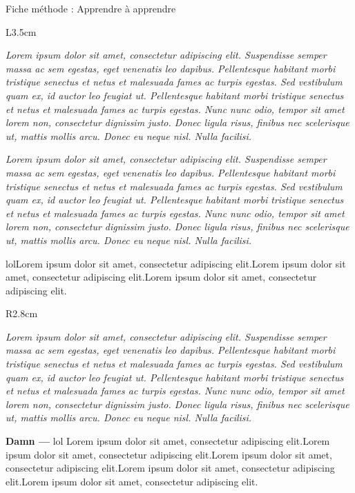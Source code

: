 \documentclass[10pt]{article}
\newcommand{\titre}{Fiche méthode : Apprendre à apprendre} %
\newcommand{\introduction}{
    Lorem ipsum dolor sit amet, consectetur adipiscing elit. Suspendisse semper massa ac sem egestas, eget venenatis leo dapibus. Pellentesque habitant morbi tristique senectus et netus et malesuada fames ac turpis egestas. Sed vestibulum quam ex, id auctor leo feugiat ut. Pellentesque habitant morbi tristique senectus et netus et malesuada fames ac turpis egestas. Nunc nunc odio, tempor sit amet lorem non, consectetur dignissim justo. Donec ligula risus, finibus nec scelerisque ut, mattis mollis arcu. Donec eu neque nisl. Nulla facilisi.
    }
\begin{document}
\thispagestyle{fancy}
\cfoot{}

\begin{titlebox}{\titre}
    \begin{wrapfigure}[]{L}{3.5cm}
        \vspace*{-0.7cm}
    \end{wrapfigure}%
    \textit{\introduction}
    
    \tcblower
    
    \textit{\introduction}
    

    lolLorem ipsum dolor sit amet, consectetur adipiscing elit.Lorem ipsum dolor sit amet, consectetur adipiscing elit.Lorem ipsum dolor sit amet, consectetur adipiscing elit.


        \begin{wrapfigure}[]{R}{2.8cm}
            \vspace*{-0.75cm}
        \vspace{-30pt}
        \end{wrapfigure}%
        \textit{\introduction}
    \linebreak[4]

    
    \textbf{\color{DarkRed} Damn ---} lol Lorem ipsum dolor sit amet, consectetur adipiscing elit.Lorem ipsum dolor sit amet, consectetur adipiscing elit.Lorem ipsum dolor sit amet, consectetur adipiscing elit.Lorem ipsum dolor sit amet, consectetur adipiscing elit.Lorem ipsum dolor sit amet, consectetur adipiscing elit.

    


    
\end{titlebox}
\end{document}
